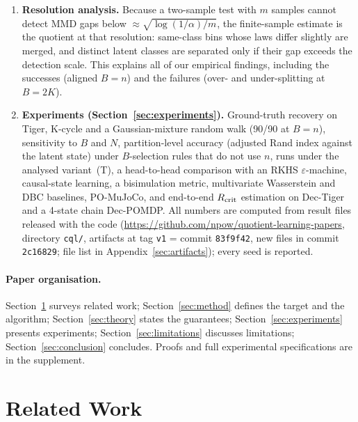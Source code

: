 \documentclass[10pt]{article}
\begin{document}
\begin{enumerate}
  procedure and Section~\ref{sec:variantT} reports the experiments run under~(T).
\item \textbf{Resolution analysis.}  Because a two-sample test with $m$
  samples cannot detect MMD gaps below $\approx\sqrt{\log(1/\alpha)/m}$, the
  finite-sample estimate is the quotient at that resolution: same-class bins
  whose laws differ slightly are merged, and distinct latent classes are
  separated only if their gap exceeds the detection scale.  This explains all
  of our empirical findings, including the successes (aligned $B{=}n$) and the
  failures (over- and under-splitting at $B{=}2K$).
\item \textbf{Experiments (Section~\ref{sec:experiments}).}  Ground-truth
  recovery on Tiger, K-cycle and a Gaussian-mixture random walk (90/90 at
  $B{=}n$), sensitivity to $B$ and $N$, partition-level accuracy (adjusted Rand
  index against the latent state) under $B$-selection rules that do not use
  $n$, runs under the analysed variant~(T), a head-to-head comparison with an
  RKHS $\varepsilon$-machine, causal-state learning, a bisimulation metric,
  multivariate Wasserstein and DBC baselines, PO-MuJoCo, and end-to-end
  $R_{\rm crit}$ estimation on Dec-Tiger and a 4-state chain Dec-POMDP.  All
  numbers are computed from result files released with the code
  (\url{https://github.com/npow/quotient-learning-papers}, directory
  \texttt{cql/}, artifacts at tag \texttt{v1} = commit \texttt{83f9f42}, new files in commit \texttt{2c16829}; file list in
  Appendix~\ref{sec:artifacts}); every seed is reported.
\end{enumerate}

\paragraph{Paper organisation.}
Section~\ref{sec:related} surveys related work; Section~\ref{sec:method}
defines the target and the algorithm; Section~\ref{sec:theory} states the
guarantees; Section~\ref{sec:experiments} presents experiments;
Section~\ref{sec:limitations} discusses limitations; Section~\ref{sec:conclusion}
concludes.  Proofs and full experimental specifications are in the supplement.

\section{Related Work}
\label{sec:related}
\end{document}
